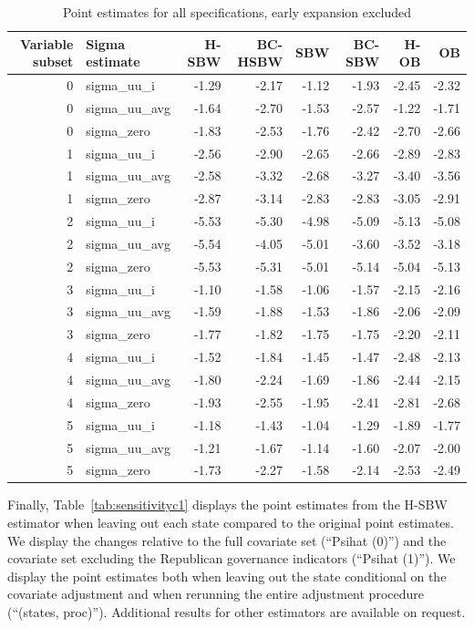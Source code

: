\documentclass[12pt]{article}
\begin{document}
\begin{table}[ht]
\centering
\begin{tabular}{rlrrrrrr}
  \toprule
Variable subset & Sigma estimate & H-SBW & BC-HSBW & SBW & BC-SBW & H-OB & OB \\ 
  \midrule
0 & sigma\_uu\_i & -1.29 & -2.17 & -1.12 & -1.93 & -2.45 & -2.32 \\ 
  0 & sigma\_uu\_avg & -1.64 & -2.70 & -1.53 & -2.57 & -1.22 & -1.71 \\ 
  0 & sigma\_zero & -1.83 & -2.53 & -1.76 & -2.42 & -2.70 & -2.66 \\ 
  1 & sigma\_uu\_i & -2.56 & -2.90 & -2.65 & -2.66 & -2.89 & -2.83 \\ 
  1 & sigma\_uu\_avg & -2.58 & -3.32 & -2.68 & -3.27 & -3.40 & -3.56 \\ 
  1 & sigma\_zero & -2.87 & -3.14 & -2.83 & -2.83 & -3.05 & -2.91 \\ 
  2 & sigma\_uu\_i & -5.53 & -5.30 & -4.98 & -5.09 & -5.13 & -5.08 \\ 
  2 & sigma\_uu\_avg & -5.54 & -4.05 & -5.01 & -3.60 & -3.52 & -3.18 \\ 
  2 & sigma\_zero & -5.53 & -5.31 & -5.01 & -5.14 & -5.04 & -5.13 \\ 
  3 & sigma\_uu\_i & -1.10 & -1.58 & -1.06 & -1.57 & -2.15 & -2.16 \\ 
  3 & sigma\_uu\_avg & -1.59 & -1.88 & -1.53 & -1.86 & -2.06 & -2.09 \\ 
  3 & sigma\_zero & -1.77 & -1.82 & -1.75 & -1.75 & -2.20 & -2.11 \\ 
  4 & sigma\_uu\_i & -1.52 & -1.84 & -1.45 & -1.47 & -2.48 & -2.13 \\ 
  4 & sigma\_uu\_avg & -1.80 & -2.24 & -1.69 & -1.86 & -2.44 & -2.15 \\ 
  4 & sigma\_zero & -1.93 & -2.55 & -1.95 & -2.41 & -2.81 & -2.68 \\ 
  5 & sigma\_uu\_i & -1.18 & -1.43 & -1.04 & -1.29 & -1.89 & -1.77 \\ 
  5 & sigma\_uu\_avg & -1.21 & -1.67 & -1.14 & -1.60 & -2.07 & -2.00 \\ 
  5 & sigma\_zero & -1.73 & -2.27 & -1.58 & -2.14 & -2.53 & -2.49 \\ 
   \bottomrule
\end{tabular}
   \caption{Point estimates for all specifications, early expansion excluded}
    \label{tab:secondaryptests}
\end{table}

Finally, Table~\ref{tab:sensitivityc1} displays the point estimates from the H-SBW estimator when leaving out each state compared to the original point estimates. We display the changes relative to the full covariate set (``Psihat (0)'') and the covariate set excluding the Republican governance indicators (``Psihat (1)''). We display the point estimates both when leaving out the state conditional on the covariate adjustment and when rerunning the entire adjustment procedure (``(states, proc)''). Additional results for other estimators are available on request.
\end{document}
